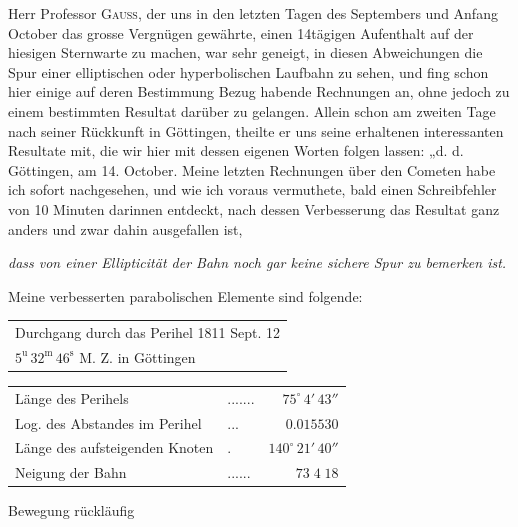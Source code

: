 \par\indent Herr Professor \textsc{Gauss}, der uns in den letzten Tagen des Septembers und Anfang October das grosse Vergnügen gewährte, einen 14tägigen Aufenthalt auf der hiesigen Sternwarte zu machen, war sehr geneigt, in diesen Abweichungen die Spur einer elliptischen oder hyperbolischen Laufbahn zu sehen, und fing schon hier einige auf deren Bestimmung Bezug habende Rechnungen an, ohne jedoch zu einem bestimmten Resultat darüber zu gelangen. Allein schon am zweiten Tage nach seiner Rückkunft in Göttingen, theilte er uns seine erhaltenen interessanten Resultate mit, die wir hier mit dessen eigenen Worten folgen lassen: „d. d. Göttingen, am 14. October. Meine letzten Rechnungen über den Cometen habe ich sofort nachgesehen, und wie ich voraus vermuthete, bald einen Schreibfehler von 10 Minuten darinnen entdeckt, nach dessen Verbesserung das Resultat ganz anders und zwar dahin ausgefallen ist,

\begin{center}
\emph{dass von einer Ellipticität der Bahn noch gar keine sichere Spur zu bemerken ist.}
\end{center}

\noindent Meine verbesserten parabolischen Elemente sind folgende:

\begin{center}\fontsize{10}{12}\selectfont\setlength{\tabcolsep}{4pt}\renewcommand{\arraystretch}{1.15}\begin{tabular}{l}
Durchgang durch das Perihel 1811 Sept. 12\\
\quad $5^{\mathrm u}\,32^{\mathrm m}\,46^{\mathrm s}$ M. Z. in Göttingen\\
\end{tabular}\end{center}
\begin{center}\fontsize{10}{12}\selectfont\setlength{\tabcolsep}{3pt}\renewcommand{\arraystretch}{1.15}\begin{tabular}{llr}
Länge des Perihels & .\;.\;.\;.\;.\;.\;. & $75^\circ\,4'\,43''$\\
Log. des Abstandes im Perihel & .\;.\;. & $0.015530$\\
Länge des aufsteigenden Knoten & . & $140^\circ\,21'\,40''$\\
Neigung der Bahn & .\;.\;.\;.\;.\;. & $73\;4\;18$\\
\end{tabular}\end{center}
\noindent Bewegung rückläufig

